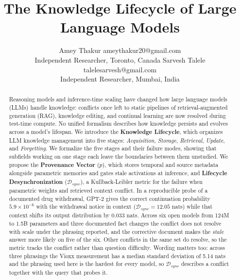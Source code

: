 \documentclass[10pt]{article}
\title{The Knowledge Lifecycle of Large Language Models}
\author{\name Amey Thakur \email ameythakur20@gmail.com \\
      \addr Independent Researcher, Toronto, Canada
      \AND
      \name Sarvesh Talele \email talelesarvesh@gmail.com \\
      \addr Independent Researcher, Mumbai, India}
\begin{document}
\maketitle

\begin{abstract}
Reasoning models and inference-time scaling have changed how large language models (LLMs) handle knowledge: conflicts once left to static pipelines of retrieval-augmented generation (RAG), knowledge editing, and continual learning are now resolved during test-time compute. No unified formalism describes how knowledge persists and evolves across a model's lifespan. We introduce the \textbf{Knowledge Lifecycle}, which organizes LLM knowledge management into five stages: \textit{Acquisition}, \textit{Storage}, \textit{Retrieval}, \textit{Update}, and \textit{Forgetting}. We formalize the five stages and their failure modes, showing that subfields working on one stage each leave the boundaries between them unstudied. We propose the \textbf{Provenance Vector} ($p$), which stores temporal and source metadata alongside parametric memories and gates stale activations at inference, and \textbf{Lifecycle Desynchronization} ($\mathcal{D}_{sync}$), a Kullback-Leibler metric for the failure when parametric weights and retrieved context conflict. In a reproducible probe of a documented drug withdrawal, GPT-2 gives the correct continuation probability $5.9 \times 10^{-6}$ with the withdrawal notice in context ($\mathcal{D}_{sync} = 12.05$ nats) while that context shifts its output distribution by $0.033$ nats. Across six open models from 124M to 1.5B parameters and three documented fact changes the conflict does not resolve with scale under the phrasing reported, and the corrective document makes the \textit{stale} answer more likely on five of the six. Other conflicts in the same set do resolve, so the metric tracks the conflict rather than question difficulty. Wording matters too: across three phrasings the Vioxx measurement has a median standard deviation of 5.14 nats and the phrasing used here is the hardest for every model, so $\mathcal{D}_{sync}$ describes a conflict together with the query that probes it.
\end{abstract}
\end{document}
